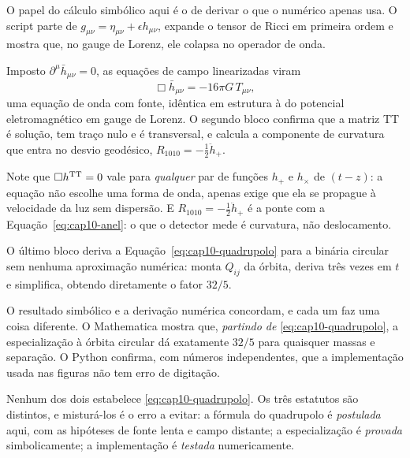
O papel do cálculo simbólico aqui é o de derivar o que o numérico apenas
usa. O script parte de $g_{\mu\nu}=\eta_{\mu\nu}+\epsilon h_{\mu\nu}$, expande
o tensor de Ricci em primeira ordem e mostra que, no gauge de Lorenz, ele
colapsa no operador de onda.

Imposto $\partial^{\mu}\bar h_{\mu\nu}=0$, as equações de campo linearizadas
viram
\[
  \Box \bar h_{\mu\nu} = -16\pi G\,T_{\mu\nu},
\]
uma equação de onda com fonte, idêntica em estrutura à do potencial
eletromagnético em gauge de Lorenz. O segundo bloco confirma que a matriz TT
é solução, tem traço nulo e é transversal, e calcula a componente de
curvatura que entra no desvio geodésico, $R_{1010}=-\tfrac12\ddot h_{+}$.

Note que $\Box h^{\rm TT}=0$ vale para \emph{qualquer} par de funções
$h_{+}$ e $h_{\times}$ de $(t-z)$: a equação não escolhe uma forma de onda,
apenas exige que ela se propague à velocidade da luz sem dispersão. E
$R_{1010}=-\tfrac12\ddot h_{+}$ é a ponte com a
Equação~\eqref{eq:cap10-anel}: o que o detector mede é curvatura, não
deslocamento.

O último bloco deriva a Equação~\eqref{eq:cap10-quadrupolo} para a binária
circular sem nenhuma aproximação numérica: monta $Q_{ij}$ da órbita, deriva
três vezes em $t$ e simplifica, obtendo diretamente o fator $32/5$.

\begin{central}
O resultado simbólico e a derivação numérica concordam, e cada um faz uma
coisa diferente. O Mathematica mostra que, \emph{partindo de}
\eqref{eq:cap10-quadrupolo}, a especialização à órbita circular dá exatamente
$32/5$ para quaisquer massas e separação. O Python confirma, com números
independentes, que a implementação usada nas figuras não tem erro de
digitação.

Nenhum dos dois estabelece \eqref{eq:cap10-quadrupolo}. Os três estatutos são
distintos, e misturá-los é o erro a evitar: a fórmula do quadrupolo é
\emph{postulada} aqui, com as hipóteses de fonte lenta e campo distante; a
especialização é \emph{provada} simbolicamente; a implementação é
\emph{testada} numericamente.
\end{central}

